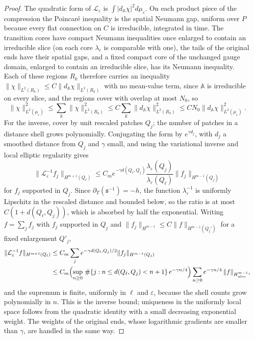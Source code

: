 \documentclass[11pt]{amsart}
\theoremstyle{definition}
\theoremstyle{remark}
\theoremstyle{plain}
\numberwithin{equation}{section}
\newcommand{\eps}{\varepsilon}
\begin{document}
\begin{proof}
The quadratic form of $\mathcal L_\eps$ is $\int|d_{\mathbb A}\chi|^2d\mu_\eps$. On each
product piece of the compression the Poincaré inequality is the spatial
Neumann gap, uniform over $P$ because every flat connection on $C$ is
irreducible, integrated in time. The transition cores have compact
Neumann inequalities once enlarged to contain an irreducible slice (on each core
$\lambda_\eps$ is comparable with one), the tails of the original ends have their spatial
gaps, and a fixed compact core of the unchanged gauge domain, enlarged to contain an
irreducible slice, has its Neumann inequality. Each of these regions $R_k$ therefore carries an inequality
$\|\chi\|_{L^2(R_k)}\le C\|d_{\mathbb A}\chi\|_{L^2(R_k)}$ with no mean-value term, since
$\mathbb A$ is irreducible on every slice, and the regions cover with overlap at most $N_0$, so
\[
\|\chi\|^2_{L^2(\mu_\eps)}\le\sum_k\|\chi\|^2_{L^2(R_k)}
\le C\sum_k\|d_{\mathbb A}\chi\|^2_{L^2(R_k)}\le CN_0\|d_{\mathbb A}\chi\|^2_{L^2(\mu_\eps)} .
\]
For the inverse,
cover by unit rescaled patches $Q_j$; the number of patches in a distance shell
grows polynomially. Conjugating the form by $e^{\gamma d_j}$, with $d_j$ a
smoothed distance from $Q_j$ and $\gamma$ small, and using the variational
inverse and local elliptic regularity gives
\[
\|\mathcal L_\eps^{-1}f_j\|_{H^{m+1}(Q_\ell)}\le C_me^{-\gamma d(Q_\ell,Q_j)}
\frac{\lambda_\eps(Q_j)}{\lambda_\eps(Q_\ell)}\|f_j\|_{H^{m-1}(Q_j)}
\]
for $f_j$ supported in $Q_j$. Since $\partial_T({\mathfrak s}^{-1})=-h$, the function
$\lambda_\eps^{-1}$ is uniformly Lipschitz in the rescaled distance and bounded
below, so the ratio is at most $C(1+d(Q_\ell,Q_j))$, which is absorbed by half
the exponential. Writing $f=\sum_jf_j$ with $f_j$ supported in $Q_j$ and
$\|f_j\|_{H^{m-1}}\le C\|f\|_{H^{m-1}(Q_j')}$ for a fixed enlargement $Q'_j$,
\begin{align*}
\|\mathcal L_\eps^{-1}f\|_{H^{m+1}(Q_\ell)}
&\le C_m\sum_je^{-\gamma d(Q_\ell,Q_j)/2}\|f_j\|_{H^{m-1}(Q_j)}\\
&\le C_m\Bigl(\sup_{n\ge0}\,\#\{j:n\le d(Q_\ell,Q_j)<n+1\}\,e^{-\gamma n/4}\Bigr)
\sum_{n\ge0}e^{-\gamma n/4}\,\|f\|_{H^{m-1}_{\rm uloc}},
\end{align*}
and the supremum is finite, uniformly in $\ell$ and $\eps$, because the shell counts grow
polynomially in $n$. This is the inverse bound; uniqueness in the
uniformly local space follows from the quadratic identity with a small
decreasing exponential weight. The weights of the original ends, whose logarithmic
gradients are smaller than $\gamma$, are handled in the same way.
\end{proof}
\end{document}

